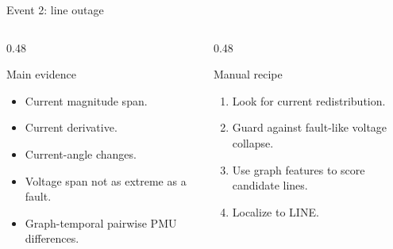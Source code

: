 \documentclass[aspectratio=169,10pt,t]{beamer}
\begin{document}
\begin{frame}{Event 2: line outage}
\small
\begin{columns}[T,totalwidth=\textwidth]
\begin{column}{0.48\textwidth}
\begin{block}{Main evidence}
\begin{itemize}
  \item Current magnitude span.
  \item Current derivative.
  \item Current-angle changes.
  \item Voltage span not as extreme as a fault.
  \item Graph-temporal pairwise PMU differences.
\end{itemize}
\end{block}
\end{column}
\begin{column}{0.48\textwidth}
\begin{alertblock}{Manual recipe}
\begin{enumerate}
  \item Look for current redistribution.
  \item Guard against fault-like voltage collapse.
  \item Use graph features to score candidate lines.
  \item Localize to LINE.
\end{enumerate}
\end{alertblock}
\end{column}
\end{columns}
\end{frame}



\end{document}
